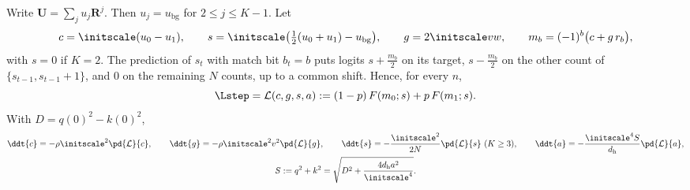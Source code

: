 \begin{lemma}
\label{lem:J-reduce}
Write $\mathbf U=\sum_ju_j\mathbf R^j$. Then $u_j=u_{\mathrm{bg}}$ for $2\le j\le K-1$. Let
\[
 c=\initscale(u_0-u_1),\qquad s=\initscale\bigl(\tfrac{1}{2}(u_0+u_1)-u_{\mathrm{bg}}\bigr),\qquad g=2\initscale vw,\qquad m_b=(-1)^b\bigl(c+g\,r_b\bigr),
\]
with $s=0$ if $K=2$. The prediction of $s_t$ with match bit $b_t=b$ puts logits $s+\frac{m_b}{2}$ on its target, $s-\frac{m_b}{2}$ on the other count of
$\{s_{t-1},s_{t-1}+1\}$, and $0$ on the remaining $N$ counts, up to a common shift. Hence, for every $n$,
\[
 \Lstep=\mathcal L(c,g,s,a):=(1-p)\,F(m_0;s)+p\,F(m_1;s).
\]
With $D=q(0)^2-k(0)^2$,
\begin{equation}
 \begin{gathered}
 \ddt{c}=-\rho\initscale^2\pd{\mathcal L}{c},\qquad \ddt{g}=-\rho\initscale^2v^2\pd{\mathcal L}{g},\qquad \ddt{s}=-\frac{\initscale^2}{2N}\pd{\mathcal L}{s}\ (K\ge3),\qquad \ddt{a}=-\frac{\initscale^4S}{d_{\mathrm h}}\pd{\mathcal L}{a},\\
 S:=q^2+k^2=\sqrt{D^2+\frac{4d_{\mathrm h}a^2}{\initscale^4}}.
 \end{gathered}
 \label{eq:J-flow}
\end{equation}
\end{lemma}

